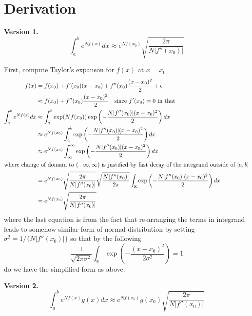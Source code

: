 \documentclass[fontsize=12pt]{article}
\begin{document}
\section{Derivation}\label{sec:derivation}

\vspace{0.2cm}
\begin{mdframed}
\textbf{Version 1.}
\begin{equation*}
\int_{a}^{b} e^{N f(x)} dx \approx e^{N f(x_0)} \sqrt{\frac{2\pi}{N |f''(x_0)|}}
\end{equation*}
\end{mdframed}


First, compute Taylor's expanson for $f(x)$ at $x=x_0$
\begin{align*}
f(x) &= f(x_0) + f'(x_0) (x-x_0) + f''(x_0) \frac{(x-x_0)^2}{2} + \epsilon \\
&\approx f(x_0) + f''(x_0) \frac{(x-x_0)^2}{2} \quad \textrm{since }f'(x_0)=0 \text{ in that }\\
\int_a^b e^{N f(x)} dx &\approx \int_{a}^b \exp(N f(x_0)) \exp \left(- \frac{N |f''(x_0)| (x-x_0)^2}{2}  \right) dx \\
&\approx e^{N f(x_0)} \int_{a}^b \exp \left(- \frac{N |f''(x_0)| (x-x_0)^2}{2}  \right) dx \\
&\approx e^{N f(x_0)} \int_\infty^\infty \exp \left(- \frac{N |f''(x_0)| (x-x_0)^2}{2}  \right) dx \\
\intertext{where change of domain to $(-\infty,\infty)$ is justified by fast decay of the integrand outside of $[a,b]$} 
&= e^{N f(x_0)} \sqrt{\frac{2\pi}{N |f''(x_0)|}} \sqrt{\frac{N |f''(x_0)|}{2\pi}} \int_\mathbb{R}  \exp \left(- \frac{N |f''(x_0)| (x-x_0)^2}{2}  \right) dx \\
&= e^{N f(x_0)} \sqrt{\frac{2\pi}{N |f''(x_0)|}}
\end{align*}
where the last equation is from the fact that re-arranging the terms in integrand leads to somehow similar form of normal distribution by setting $\sigma^2 = 1/ \{N|f''(x_0)|\}$ so that by the following
\begin{equation*}
\frac{1}{\sqrt{2\pi \sigma^2}} \int_\mathbb{R} \exp\left(-\frac{(x-x_0)^2}{2\sigma^2}\right) = 1
\end{equation*}
do we have the simplified form as above. 

\vspace{0.2cm}
\begin{mdframed}
\textbf{Version 2.}
	\begin{equation*}
	\int_{a}^{b} e^{N f(x)} g(x) dx \approx e^{N f(x_0)} g(x_0) \sqrt{\frac{2\pi}{N |f''(x_0)|}}
	\end{equation*}
\end{mdframed}
\end{document}
